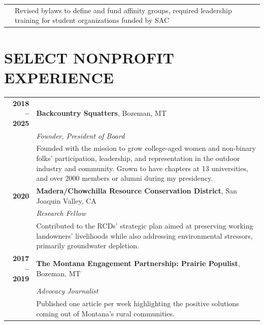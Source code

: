 \documentclass[11pt]{article}
\begin{document}
\begin{longtable}{>{\bfseries}r p{5.5in}}
        & Revised bylaws to define and fund affinity groups, required leadership training for student organizations funded by SAC \\[1ex]
\end{longtable}

\section*{SELECT NONPROFIT EXPERIENCE}
\begin{longtable}{>{\bfseries}r p{5.5in}}%
2018 -- 2025 & \textbf{Backcountry Squatters}, Bozeman, MT \\
    & \textit{Founder, President of Board} \\
    & Founded with the mission to grow college-aged women and non-binary folks’ participation, leadership, and representation in the outdoor industry and community. Grown to have chapters at 13 universities, and over 2000 members or alumni during my presidency. \\
2020 & \textbf{Madera/Chowchilla Resource Conservation District}, San Joaquin Valley, CA \\
    & \textit{Research Fellow}\\
    & Contributed to the RCDs’ strategic plan aimed at preserving working landowners’ livelihoods while also addressing environmental stressors, primarily groundwater depletion. \\
2017 -- 2019 & \textbf{The Montana Engagement Partnership: Prairie Populist}, Bozeman, MT \\
    & \textit{Advocacy Journalist} \\
    & Published one article per week highlighting the positive solutions coming out of Montana’s rural communities. \\[1ex]
\end{longtable}
\end{document}
